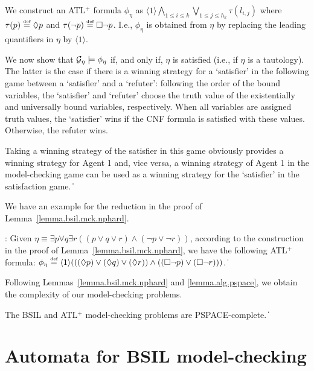 \documentclass[11pt]{article}
\newcommand{\calg}{{\cal G}}
\newcommand{\defn}{\stackrel{\mbox{\tiny def}}{=}}
\newcommand{\pfrr}{\Box}
\newcommand{\pevt}{\Diamond}
\def\qed{\ifmmode\|\else{\unskip\nobreak\hfil
\penalty50\hskip1em\null\nobreak\hfil$\blacksquare$
\parfillskip=0pt\finalhyphendemerits=0\endgraf}\fi}
\begin{document}
We construct an ATL$^+$ formula $\phi_\eta$
as %
$\langle 1\rangle \bigwedge_{1\leq i\leq k}
\bigvee_{1\leq j\leq h_k} \tau(l_{i,j})$ 
where $\tau(p)\defn \pevt p$ and $\tau(\neg p)\defn \pfrr \neg p$. 
I.e., $\phi_\eta$ is obtained from $\eta$ by replacing the leading quantifiers in $\eta$ by $\langle 1 \rangle$.

We now show that $\calg_\eta \models \phi_\eta$ if, and only if, $\eta$ is satisfied (i.e., if $\eta$ is a tautology).
The  latter is the case if there is a winning strategy for a `satisfier' in the following game between a `satisfier' and a `refuter':
following the order of the bound variables, the `satisfier' and `refuter' choose the truth value of the existentially and universally bound variables, respectively.
When all variables are assigned truth values, the `satisfier' wins if the CNF formula is satisfied with these values. Otherwise, the refuter wins.

Taking a winning strategy of the satisfier in this game obviously provides a winning strategy for Agent 1 and, vice versa, a winning strategy of Agent 1 in the model-checking game can be used as a winning strategy for the `satisfier' in the satisfaction game.
\qed

We have an example for the reduction in the proof 
of Lemma~\ref{lemma.bsil.mck.nphard}.  

{\example \label{exmp.bsil.nphard}:}
Given
$\eta\equiv \exists p\forall q\exists r
((p\vee q \vee r)\wedge(\neg p \vee \neg r))$,
according to the construction
in the proof of Lemma~\ref{lemma.bsil.mck.nphard},
we have the following ATL$^+$ formula:
$\phi_\eta\defn 
\langle1\rangle(((\pevt p)\vee (\pevt q) \vee (\pevt r))
  \wedge((\pfrr\neg p) \vee (\pfrr\neg r)))$.
\qed

Following Lemmas~\ref{lemma.bsil.mck.nphard} and
\ref{lemma.alg.pspace}, we obtain the complexity of our model-checking problems.

{\lemma\label{lemma.bsil.pspace.complete} The BSIL and ATL$^+$ model-checking
problems are PSPACE-complete.
} \qed



\section{Automata for BSIL model-checking
\label{sec.mck.gen}
}
\end{document}
